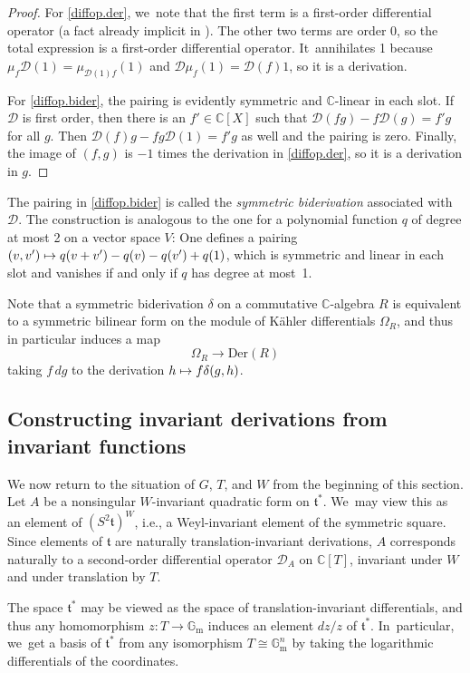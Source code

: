 \documentclass[JEP,XML,SOM,Unicode,NoFloatCountersInSection,published]{cedram}
\newcommand\mto{\mathchoice{\longmapsto}{\mapsto}{\mapsto}{\mapsto}}
\theoremstyle{definition}
\newcommand{\stacklink}[1]{\href{https://stacks.math.columbia.edu/tag/#1}{#1}}
\newcommand{\stacks}[1]{\cite[Tag \stacklink{#1}]{stacks-project}}
\newcommand{\mft}{\mathfrak{t}}
\newcommand{\C}{\mathbb{C}}
\newcommand{\Gm}{\mathbb{G}_{\mathrm{m}}}
\newcommand{\mcD}{\mathcal{D}}
\begin{document}
\begin{proof}
For \eqref{diffop.der}, we~note that the first term is a first-order differential operator (a fact already implicit in \stacks{0G35}). The other two terms are order 0, so the total expression is a first-order differential operator. It~annihilates 1 because $\mu_f \mcD(1) = \mu_{\mcD(1)f}(1)$ and $\mcD \mu_f(1) = \mcD(f)1$, so it is a derivation.

For \eqref{diffop.bider}, the pairing is evidently symmetric and $\C$-linear in each slot. If $\mcD$ is first order, then there is an $f' \in \C[X]$ such that $\mcD(fg) - f\mcD(g) = f' g$ for all $g$. Then $\mcD(f)g - fg\mcD(1) = f'g$ as well and the pairing is zero. Finally, the image of $(f, g)$ is $-1$ times the derivation in \eqref{diffop.der}, so it is a derivation in $g$.
\end{proof}

The pairing in \eqref{diffop.bider} is called the \emph{symmetric
biderivation} associated with $\mcD$. The construction is analogous to the
one for a polynomial function $q$ of degree at most 2 on a vector space
$V$: One defines a pairing $(v, v') \mto q(v + v') - q(v) - q(v') +
q(1)$, which is symmetric and linear in each slot and vanishes if and only
if $q$ has degree at most~1.

Note that a symmetric biderivation $\delta$ on a commutative
$\C$-algebra $R$ is
equivalent to a symmetric bilinear form on the module of Kähler differentials $\Omega_R$, and thus in
particular induces a map
\[
\Omega_R\to \text{Der}(R)
\]
taking $f\,dg$ to the derivation $h\mto f\delta(g,h)$.

\subsection*{Constructing invariant derivations from invariant functions}
We now return to the situation of $G$, $T$, and $W$ from the beginning of this section.
Let $A$ be a nonsingular $W$-invariant quadratic form on $\mft^*$. We~may view this as an element of $(S^2\mft)^W$, i.e., a Weyl-invariant element of the symmetric square. Since
elements of $\mft$ are naturally translation-invariant derivations,
$A$ corresponds naturally to a second-order differential operator $\mcD_A$
on $\C[T]$, invariant under $W$ and under translation by $T$.

The space
$\mft^*$ may be viewed as the space of translation-invariant
differentials, and thus any homomorphism $z\colon T\to \Gm$ induces an element
$dz/z$ of $\mft^*$. In~particular, we~get a basis of $\mft^*$ from any isomorphism $T\cong \Gm^n$ by taking the logarithmic
differentials of the coordinates.
\end{document}
